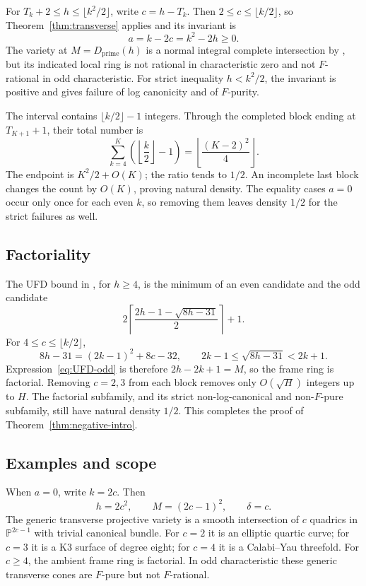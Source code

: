 \documentclass[11pt]{article}
\theoremstyle{definition}
\theoremstyle{remark}
\numberwithin{equation}{section}
\newcommand{\PP}{\mathbb P}
\newcommand{\Dpr}{D_{\mathrm{prime}}}
\begin{document}
For $T_k+2\leq h\leq\lfloor k^2/2\rfloor$, write $c=h-T_k$.
Then $2\leq c\leq\lfloor k/2\rfloor$, so
Theorem~\ref{thm:transverse} applies and its invariant is
\[
 a=k-2c=k^2-2h\geq0.
\]
The variety at $M=\Dpr(h)$ is a normal integral complete intersection
by \cite[Theorems 1 and 2]{CS}, but its indicated local ring is not
rational in characteristic zero and not $F$-rational in odd
characteristic. For strict inequality $h<k^2/2$, the invariant is
positive and gives failure of log canonicity and of $F$-purity.

The interval contains $\lfloor k/2\rfloor-1$ integers. Through the
completed block ending at $T_{K+1}+1$, their total number is
\[
 \sum_{k=4}^K\left(\left\lfloor\frac k2\right\rfloor-1\right)
 =\left\lfloor\frac{(K-2)^2}{4}\right\rfloor.
\]
The endpoint is $K^2/2+O(K)$; the ratio tends to $1/2$. An incomplete
last block changes the count by $O(K)$, proving natural density.
The equality cases $a=0$ occur only once for each even $k$, so
removing them leaves density $1/2$ for the strict failures as well.

\subsection{Factoriality}

The UFD bound in \cite[Theorem 3]{CS}, for $h\geq4$, is the minimum
of an even candidate and the odd candidate
\begin{equation}\label{eq:UFD-odd}
 2\left\lceil\frac{2h-1-\sqrt{8h-31}}2\right\rceil+1.
\end{equation}
For $4\leq c\leq\lfloor k/2\rfloor$,
\[
 8h-31=(2k-1)^2+8c-32,
 \qquad 2k-1\leq\sqrt{8h-31}<2k+1.
\]
Expression~\eqref{eq:UFD-odd} is therefore $2h-2k+1=M$, so the
frame ring is factorial. Removing $c=2,3$ from each block removes
only $O(\sqrt H)$ integers up to $H$. The factorial subfamily, and
its strict non-log-canonical and non-$F$-pure subfamily, still have
natural density $1/2$. This completes the proof of
Theorem~\ref{thm:negative-intro}.

\subsection{Examples and scope}

When $a=0$, write $k=2c$. Then
\begin{equation}\label{eq:CY-boundary}
 h=2c^2,\qquad M=(2c-1)^2,\qquad\delta=c.
\end{equation}
The generic transverse projective variety is a smooth intersection
of $c$ quadrics in $\PP^{2c-1}$ with trivial canonical bundle.
For $c=2$ it is an elliptic quartic curve; for $c=3$ it is a K3
surface of degree eight; for $c=4$ it is a Calabi--Yau threefold.
For $c\geq4$, the ambient frame ring is factorial. In odd
characteristic these generic transverse cones are $F$-pure but
not $F$-rational.
\end{document}
